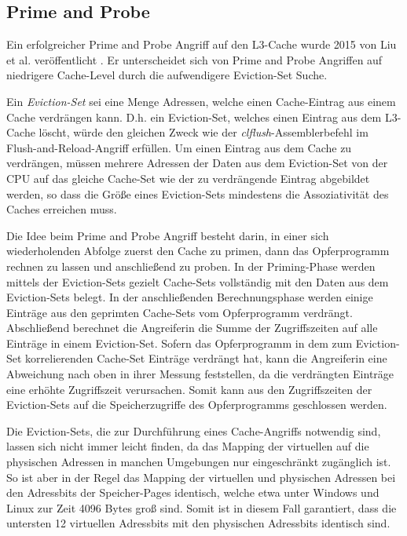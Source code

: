 \subsection{Prime and Probe}

Ein erfolgreicher Prime and Probe Angriff auf den L3-Cache wurde 2015 von Liu et al. veröffentlicht \cite{LiuPrimeAndProbe}.
Er unterscheidet sich von Prime and Probe Angriffen auf niedrigere Cache-Level durch die aufwendigere Eviction-Set Suche.

Ein \textit{Eviction-Set} sei eine Menge Adressen, welche einen Cache-Eintrag aus einem Cache verdrängen kann. D.h. ein Eviction-Set, welches einen Eintrag aus dem L3-Cache löscht, würde den gleichen Zweck wie der \textit {clflush}-Assemblerbefehl im Flush-and-Reload-Angriff erfüllen. 
Um einen Eintrag aus dem Cache zu verdrängen, müssen mehrere Adressen der Daten aus dem Eviction-Set von der CPU auf das gleiche Cache-Set wie der zu verdrängende Eintrag abgebildet werden, so dass die Größe eines Eviction-Sets mindestens die Assoziativität des Caches erreichen muss.

Die Idee beim Prime and Probe Angriff besteht darin, in einer sich wiederholenden Abfolge zuerst den Cache zu primen, dann das Opferprogramm rechnen zu lassen und anschließend zu proben.
In der Priming-Phase werden mittels der Eviction-Sets gezielt Cache-Sets vollständig mit den Daten aus dem Eviction-Sets belegt.
In der anschließenden Berechnungsphase werden einige Einträge aus den geprimten Cache-Sets vom Opferprogramm verdrängt. Abschließend berechnet die Angreiferin die Summe der Zugriffszeiten auf alle Einträge in einem Eviction-Set.
Sofern das Opferprogramm in dem zum Eviction-Set korrelierenden Cache-Set Einträge verdrängt hat, kann die Angreiferin eine Abweichung nach oben in ihrer Messung feststellen, da die verdrängten Einträge eine erhöhte Zugriffszeit verursachen. Somit kann aus den Zugriffszeiten der Eviction-Sets auf die Speicherzugriffe des Opferprogramms geschlossen werden.

Die Eviction-Sets, die zur Durchführung eines Cache-Angriffs notwendig sind, lassen sich nicht immer leicht finden, da das Mapping der virtuellen auf die physischen Adressen in manchen Umgebungen nur eingeschränkt zugänglich ist.
So ist aber in der Regel das Mapping der virtuellen und physischen Adressen bei den Adressbits der Speicher-Pages identisch, welche etwa unter Windows und Linux zur Zeit 4096 Bytes groß sind. Somit ist in diesem Fall garantiert, dass die untersten 12 virtuellen Adressbits mit den physischen Adressbits identisch sind. 

